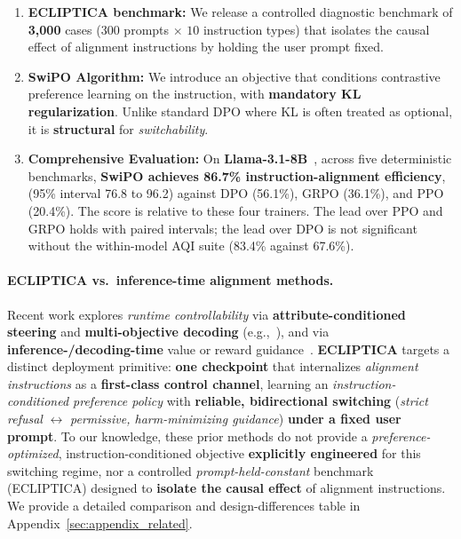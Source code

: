 \vspace{-0.35em}
\begin{enumerate}[leftmargin=*,itemsep=0em]

     \item \textbf{ECLIPTICA benchmark:} We release a controlled diagnostic benchmark of \textbf{3,000} cases ($300$ prompts $\times$ $10$ instruction types) that isolates the causal effect of alignment instructions by holding the user prompt fixed.

    \item \textbf{SwiPO Algorithm:} We introduce an objective that conditions contrastive preference learning on the instruction, with \textbf{mandatory KL regularization}.
    Unlike standard DPO where KL is often treated as optional, it is \textbf{structural} for \emph{switchability}.

    \item \textbf{Comprehensive Evaluation:} On \textbf{Llama-3.1-8B}~\cite{dubey2024llama}, across five deterministic benchmarks, \textbf{SwiPO achieves \colorbox{bg-green}{86.7\%} instruction-alignment efficiency}, (95\% interval 76.8 to 96.2) against DPO (56.1\%), GRPO (36.1\%), and PPO (20.4\%). The score is relative to these four trainers. The lead over PPO and GRPO holds with paired intervals; the lead over DPO is not significant without the within-model AQI suite (83.4\% against 67.6\%).
\end{enumerate}


\paragraph{ECLIPTICA vs.\ inference-time alignment methods.}
Recent work explores \emph{runtime controllability} via \textbf{attribute-conditioned steering} and \textbf{multi-objective decoding}
(e.g.,~\cite{dong-etal-2023-steerlm,wang-etal-2024-arithmetic,shi2024decodingtime}),
and via \textbf{inference-/decoding-time} value or reward guidance~\cite{liu-etal-2024-inference,chen2025pad}.
\textbf{ECLIPTICA} targets a distinct deployment primitive: \textbf{one checkpoint} that internalizes \emph{alignment instructions} as a \textbf{first-class control channel},
learning an \emph{instruction-conditioned preference policy} with \textbf{reliable, bidirectional switching}
(\emph{strict refusal} $\leftrightarrow$ \emph{permissive, harm-minimizing guidance}) \textbf{under a fixed user prompt}.
To our knowledge, these prior methods do not provide a \emph{preference-optimized}, instruction-conditioned objective \textbf{explicitly engineered} for this switching regime,
nor a controlled \emph{prompt-held-constant} benchmark (ECLIPTICA) designed to \textbf{isolate the causal effect} of alignment instructions.
We provide a detailed comparison and design-differences table in Appendix~\ref{sec:appendix_related}.


